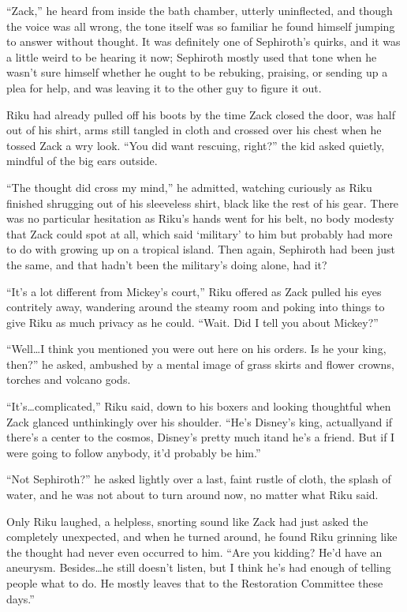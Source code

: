 ``Zack,'' he heard from inside the bath chamber, utterly uninflected, and though the voice was all wrong, the tone itself was so familiar he found himself jumping to answer without thought. It was definitely one of Sephiroth's quirks, and it was a little weird to be hearing it now; Sephiroth mostly used that tone when he wasn't sure himself whether he ought to be rebuking, praising, or sending up a plea for help, and was leaving it to the other guy to figure it out.

Riku had already pulled off his boots by the time Zack closed the door, was half out of his shirt, arms still tangled in cloth and crossed over his chest when he tossed Zack a wry look. ``You did want rescuing, right?'' the kid asked quietly, mindful of the big ears outside.

``The thought did cross my mind,'' he admitted, watching curiously as Riku finished shrugging out of his sleeveless shirt, black like the rest of his gear. There was no particular hesitation as Riku's hands went for his belt, no body modesty that Zack could spot at all, which said `military' to him but probably had more to do with growing up on a tropical island. Then again, Sephiroth had been just the same, and that hadn't been the military's doing alone, had it?

``It's a lot different from Mickey's court,'' Riku offered as Zack pulled his eyes contritely away, wandering around the steamy room and poking into things to give Riku as much privacy as he could. ``Wait. Did I tell you about Mickey?''

``Well\ldots I think you mentioned you were out here on his orders. Is he your king, then?'' he asked, ambushed by a mental image of grass skirts and flower crowns, torches and volcano gods.

``It's\ldots complicated,'' Riku said, down to his boxers and looking thoughtful when Zack glanced unthinkingly over his shoulder. ``He's Disney's king, actually\textemdash and if there's a center to the cosmos, Disney's pretty much it\textemdash and he's a friend. But if I were going to follow anybody, it'd probably be him.''

``Not Sephiroth?'' he asked lightly over a last, faint rustle of cloth, the splash of water, and he was not about to turn around now, no matter what Riku said.

Only Riku laughed, a helpless, snorting sound like Zack had just asked the completely unexpected, and when he turned around, he found Riku grinning like the thought had never even occurred to him. ``Are you kidding? He'd have an aneurysm. Besides\ldots he still doesn't listen, but I think he's had enough of telling people what to do. He mostly leaves that to the Restoration Committee these days.''

